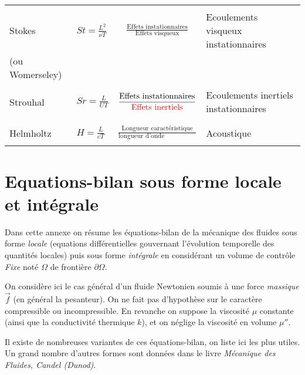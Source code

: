 \begin{landscape}
\begin{tabular}{|l   |l    |c    |l   |}
\hline
&&&\\
Stokes
 & $St =  \frac{L^2}{\nu T }$ & 
$\displaystyle\frac{ \mbox{Effets instationnaires}}{ \mbox{Effets visqueux}}$ &
Ecoulements visqueux instationnaires
\\
(ou Womerseley)  &&&\\
\hline
&&&\\
Strouhal
 & $Sr =  \frac{L}{U T} $ & 
$\displaystyle\frac{ \mbox{Effets instationnaires}}{ \mbox{\color{red}{Effets inertiels}}}$ &
Ecoulements inertiels instationnaires
\\
&&&\\
\hline
&&&\\
Helmholtz
 & $H =  \frac{L}{c T} $ & 
$\displaystyle\frac{ \mbox{Longueur caractéristique}}{ \mbox{longueur d'onde acoustique}}$ &
Acoustique
\\
&&&\\
\hline
\end{tabular}

\end{landscape}



\section{Equations-bilan sous forme locale et intégrale}

Dans cette annexe on résume les équations-bilan de la mécanique des fluides sous forme {\em locale } (equations différentielles gouvernant l'évolution temporelle des quantités locales) puis sous forme {\em intégrale } en considérant un volume de contrôle {\em Fixe} noté $\Omega$ de frontière 
$\partial \Omega$.
 


On considère ici le cas général d'un fluide Newtonien soumis à une force {\em massique} $\vec f$ (en général la pesanteur). On ne fait pas d'hypothèse sur le caractère compressible ou incompressible. En revanche on suppose la viscosité $\mu$ constante (ainsi que la conductivité thermique $k$), et on néglige la viscosité en volume $\mu''$.

Il existe de nombreuses variantes de ces équations-bilan, on liste ici les plus utiles. Un grand nombre d'autres formes sont données dans le livre {\em Mécanique des Fluides, Candel (Dunod)}.

